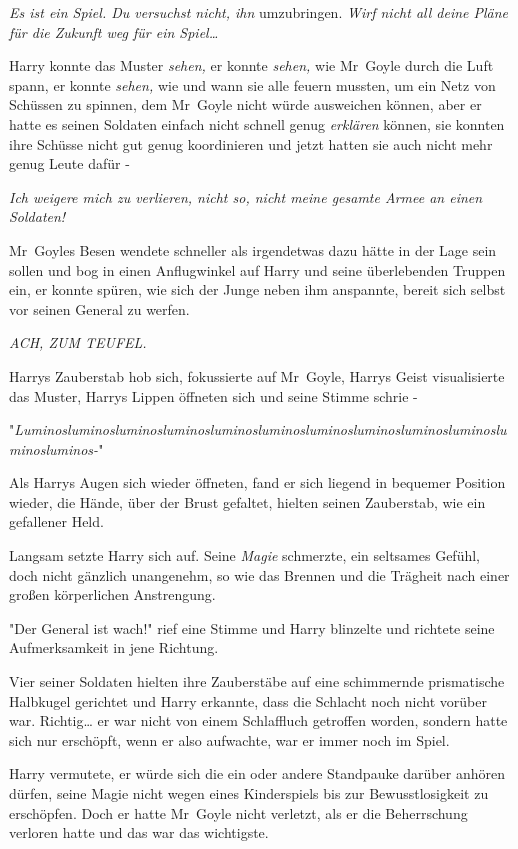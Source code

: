 {\emph{Es ist ein Spiel. Du versuchst nicht, ihn} umzubringen. \emph{Wirf nicht all deine Pläne für die Zukunft weg für ein Spiel…}

Harry konnte das Muster \emph{sehen,} er konnte \emph{sehen,} wie Mr~Goyle durch die Luft spann, er konnte \emph{sehen,} wie und wann sie alle feuern mussten, um ein Netz von Schüssen zu spinnen, dem Mr~Goyle nicht würde ausweichen können, aber er hatte es seinen Soldaten einfach nicht schnell genug \emph{erklären} können, sie konnten ihre Schüsse nicht gut genug koordinieren und jetzt hatten sie auch nicht mehr genug Leute dafür -

\emph{Ich weigere mich zu verlieren, nicht so, nicht meine gesamte Armee an einen Soldaten!}

Mr~Goyles Besen wendete schneller als irgendetwas dazu hätte in der Lage sein sollen und bog in einen Anflugwinkel auf Harry und seine überlebenden Truppen ein, er konnte spüren, wie sich der Junge neben ihm anspannte, bereit sich selbst vor seinen General zu werfen.

\emph{ACH, ZUM TEUFEL.}

Harrys Zauberstab hob sich, fokussierte auf Mr~Goyle, Harrys Geist visualisierte das Muster, Harrys Lippen öffneten sich und seine Stimme schrie -

"\emph{Luminosluminosluminosluminosluminosluminosluminosluminosluminosluminosluminosluminos-}"

\later

Als Harrys Augen sich wieder öffneten, fand er sich liegend in bequemer Position wieder, die Hände, über der Brust gefaltet, hielten seinen Zauberstab, wie ein gefallener Held.

Langsam setzte Harry sich auf. Seine \emph{Magie} schmerzte, ein seltsames Gefühl, doch nicht gänzlich unangenehm, so wie das Brennen und die Trägheit nach einer großen körperlichen Anstrengung.

"Der General ist wach!" rief eine Stimme und Harry blinzelte und richtete seine Aufmerksamkeit in jene Richtung.

Vier seiner Soldaten hielten ihre Zauberstäbe auf eine schimmernde prismatische Halbkugel gerichtet und Harry erkannte, dass die Schlacht noch nicht vorüber war. Richtig… er war nicht von einem Schlaffluch getroffen worden, sondern hatte sich nur erschöpft, wenn er also aufwachte, war er immer noch im Spiel.

Harry vermutete, er würde sich die ein oder andere Standpauke darüber anhören dürfen, seine Magie nicht wegen eines Kinderspiels bis zur Bewusstlosigkeit zu erschöpfen. Doch er hatte Mr~Goyle nicht verletzt, als er die Beherrschung verloren hatte und das war das wichtigste.

}
